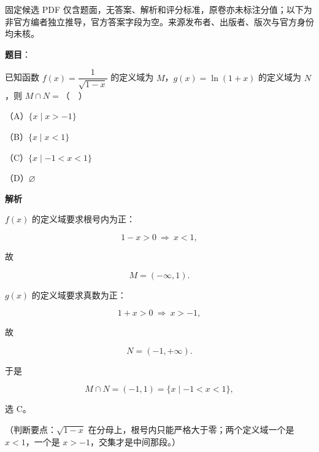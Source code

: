 

\begin{gktip}
固定候选 PDF 仅含题面，无答案、解析和评分标准，原卷亦未标注分值；以下为非官方编者独立推导，官方答案字段为空。来源发布者、出版者、版次与官方身份均未核。
\end{gktip}

\begin{answer}

\textbf{题目}：

已知函数 $f(x)=\dfrac{1}{\sqrt{1-x}}$ 的定义域为 $M$，$g(x)=\ln(1+x)$ 的定义域为 $N$，则 $M\cap N=$（　）

（A）$\{x\mid x>-1\}$

（B）$\{x\mid x<1\}$

（C）$\{x\mid -1<x<1\}$

（D）$\varnothing$

\textbf{解析}

$f(x)$ 的定义域要求根号内为正：

\nopagebreak[4]
\[1-x>0\ \Rightarrow\ x<1,\]

故

\nopagebreak[4]
\[M=(-\infty,1).\]

$g(x)$ 的定义域要求真数为正：

\nopagebreak[4]
\[1+x>0\ \Rightarrow\ x>-1,\]

故

\nopagebreak[4]
\[N=(-1,+\infty).\]

于是

\nopagebreak[4]
\[M\cap N=(-1,1)=\{x\mid -1<x<1\},\]

选 C。

（判断要点：$\sqrt{1-x}$ 在分母上，根号内只能严格大于零；两个定义域一个是 $x<1$，一个是 $x>-1$，交集才是中间那段。）


\end{answer}
